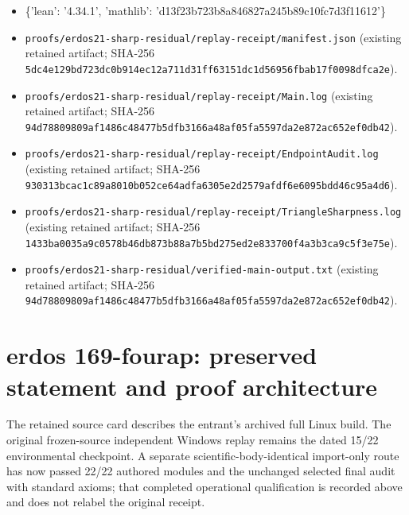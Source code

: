 \documentclass[11pt,a4paper]{article}
\begin{document}
\begin{itemize}
\item \{'lean': '4.34.1', 'mathlib': 'd13f23b723b8a846827a245b89c10fc7d3f11612'\}
\end{itemize}
\begin{itemize}
\item \texttt{proofs/erdos21-sharp-residual/replay-receipt/manifest.json} (existing retained artifact; SHA-256 \texttt{5dc4e129bd723dc0b914ec12a711d31ff63151dc1d56956fbab17f0098dfca2e}).
\end{itemize}
\begin{itemize}
\item \texttt{proofs/erdos21-sharp-residual/replay-receipt/Main.log} (existing retained artifact; SHA-256 \texttt{94d78809809af1486c48477b5dfb3166a48af05fa5597da2e872ac652ef0db42}).
\end{itemize}
\begin{itemize}
\item \texttt{proofs/erdos21-sharp-residual/replay-receipt/EndpointAudit.log} (existing retained artifact; SHA-256 \texttt{930313bcac1c89a8010b052ce64adfa6305e2d2579afdf6e6095bdd46c95a4d6}).
\end{itemize}
\begin{itemize}
\item \texttt{proofs/erdos21-sharp-residual/replay-receipt/TriangleSharpness.log} (existing retained artifact; SHA-256 \texttt{1433ba0035a9c0578b46db873b88a7b5bd275ed2e833700f4a3b3ca9c5f3e75e}).
\end{itemize}
\begin{itemize}
\item \texttt{proofs/erdos21-sharp-residual/verified-main-output.txt} (existing retained artifact; SHA-256 \texttt{94d78809809af1486c48477b5dfb3166a48af05fa5597da2e872ac652ef0db42}).
\end{itemize}
\clearpage
\section{erdos 169-fourap: preserved statement and proof architecture}
The retained source card describes the entrant's archived full Linux build. The original frozen-source independent Windows replay remains the dated 15/22 environmental checkpoint. A separate scientific-body-identical import-only route has now passed 22/22 authored modules and the unchanged selected final audit with standard axioms; that completed operational qualification is recorded above and does not relabel the original receipt.
\end{document}
